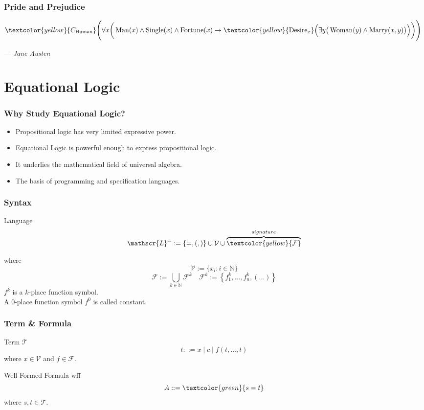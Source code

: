 \documentclass[UTF8,aspectratio=43,11pt,colorlinks,compress,openany]{beamer}%
\begin{document}
\begin{frame}\frametitle{Pride and Prejudice}
$\textcolor{yellow}{C_{\operatorname{Human}}}\Bigg(\forall x\bigg(\operatorname{Man}(x)\wedge \operatorname{Single}(x)\wedge \operatorname{Fortune}(x) \to \textcolor{yellow}{\operatorname{Desire}_x}\Big(\exists y\big(\operatorname{Woman}(y)\wedge \operatorname{Marry}(x,y)\big)\Big)\bigg)\Bigg)$\par\hfill --- \textsl{Jane Austen}
\end{frame}


\section{Equational Logic}


\begin{frame}\frametitle{Why Study Equational Logic?}
	\begin{itemize}
		\item Propositional logic has very limited expressive power.
		\item Equational Logic is powerful enough to express propositional logic.
		\item It underlies the mathematical field of universal algebra.
		\item The basis of programming and specification languages.
	\end{itemize}
\end{frame}

\begin{frame}\frametitle{Syntax}
	\begin{block}{Language}
		\[\mathscr{L}^=:=\{=,(,)\}\cup\mathcal{V}\cup\overbrace{\textcolor{yellow}{\mathcal{F}}}^{signature}\]
	\end{block}
	where
	\[\mathcal{V}:=\{x_i: i\in\mathbb{N}\}\]
	\[\mathcal{F}:=\bigcup\limits_{k\in\mathbb{N}}\mathcal{F}^k\quad \mathcal{F}^k:=\left\{f_1^k,\dots,f_n^k,(\dots)\right\}\]
	$f^k$ is a $k$-place function symbol.\\
	A $0$-place function symbol $f^0$ is called constant.
\end{frame}

\begin{frame}\frametitle{Term \& Formula}
	\begin{block}{Term $\mathcal{T}$}
		\[t::=x\mid c\mid f(t,\dots,t)\]
		where $x\in\mathcal{V}$ and $f\in\mathcal{F}$.
	\end{block}
	\begin{block}{Well-Formed Formula $\mathrm{wff}$}
		\[A::=\textcolor{green}{s=t}\]
		where $s,t\in\mathcal{T}$.
	\end{block}
\end{frame}
\end{document}
